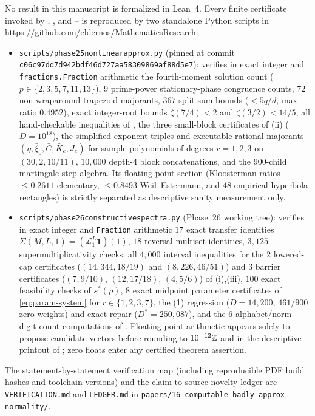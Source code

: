 \documentclass[11pt]{article}
\newcommand{\ttt}[1]{\texttt{\begingroup\def\_{\textunderscore\discretionary{}{}{}}#1\endgroup}}
\newcommand{\ind}{\mathbf{1}}
\newcommand{\Lop}{\mathcal{L}}
\begin{document}
No result in this manuscript is formalized in Lean~4. Every finite certificate invoked by , , and -- is reproduced by two standalone Python scripts in \url{https://github.com/eldernos/MathematicsResearch}:
\begin{itemize}[nosep]
\item \ttt{scripts/phase25\_nonlinear\_approx.py} (pinned at commit \nolinkurl{c06c97dd7d942bdf46d727aa58309869af88d5e7}): verifies in exact integer and \ttt{fractions.Fraction} arithmetic the fourth-moment solution count ($p\in\{2,3,5,7,11,13\}$), $9$ prime-power stationary-phase congruence counts, $72$ non-wraparound trapezoid majorants, $367$ split-sum bounds ($<5q/d$, max ratio $0.4952$), exact integer-root bounds $\zeta(7/4)<2$ and $\zeta(3/2)<14/5$, all hand-checkable inequalities of , the three small-block certificates of (ii) ($D=10^{18}$), the simplified exponent triples and executable rational majorants $(\eta,\bar\xi_0,\bar C,\bar K_e,J_e)$ for sample polynomials of degrees $r=1,2,3$ on $(30,2,10/11)$, $10{,}000$ depth-$4$ block concatenations, and the $900$-child martingale step algebra. Its floating-point section (Kloosterman ratios $\le0.2611$ elementary, $\le0.8493$ Weil--Estermann, and $48$ empirical hyperbola rectangles) is strictly separated as descriptive sanity measurement only.
\item \ttt{scripts/phase26\_constructive\_spectra.py} (Phase~26 working tree): verifies in exact integer and \ttt{Fraction} arithmetic $17$ exact transfer identities $\Sigma(M,L,1)=(\Lop_1^L\ind)(1)$, $18$ reversal multiset identities, $3{,}125$ supermultiplicativity checks, all $4{,}000$ interval inequalities for the $2$ lowered-cap certificates ($(14,344,18/19)$ and $(8,226,46/51)$) and $3$ barrier certificates ($(7,9/10)$, $(12,17/18)$, $(4,5/6)$) of (i),(iii), $100$ exact feasibility checks of $s^*(\rho)$, $8$ exact midpoint parameter certificates of \eqref{eq:param-system} for $r\in\{1,2,3,7\}$, the (1) regression ($D=14{,}200$, $461/900$ zero weights) and exact repair ($D^*=250{,}087$), and the $6$ alphabet/norm digit-count computations of . Floating-point arithmetic appears solely to propose candidate vectors before rounding to $10^{-12}\mathbb Z$ and in the descriptive printout of ; zero floats enter any certified theorem assertion.
\end{itemize}
The statement-by-statement verification map (including reproducible PDF build hashes and toolchain versions) and the claim-to-source novelty ledger are \ttt{VERIFICATION.md} and \ttt{LEDGER.md} in \ttt{papers/16-computable-badly-approx-normality/}.
\end{document}
